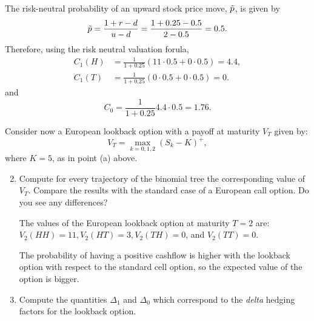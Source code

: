 \documentclass[handout,8pt]{beamer}
\begin{document}
\begin{frame}[allowframebreaks]{ }
\begin{enumerate}
\begin{enumerate}
        The risk-neutral probability of an upward stock price move, $\Tilde{p}$, is given by
        \begin{equation*}
            \Tilde{p}=\frac{1+r-d}{u-d} = \frac{1+0.25-0.5}{2-0.5}=0.5.
        \end{equation*}
        Therefore, using the risk neutral valuation forula,
        \begin{align*}
            C_1(H) &=\frac{1}{1+0.25}(11\cdot 0.5 + 0\cdot 0.5) = 4.4,\\
            C_1(T) &=\frac{1}{1+0.25}(0\cdot 0.5 + 0\cdot 0.5) = 0.
        \end{align*}
        and
        \begin{equation*}
            C_0 = \frac{1}{1+0.25}4.4\cdot 0.5 = 1.76.
        \end{equation*}
    \end{enumerate}

    Consider now a European lookback option with a payoff at maturity $V_T$ given by:
    \begin{equation*}
        V_T=\max_{k=0,1,2}(S_k-K)^+,
    \end{equation*}
    where $K=5$, as in point (a) above.
    
    \begin{enumerate}
        \setcounter{enumii}{1}
    
        \item Compute for every trajectory of the binomial tree the corresponding value of $V_T$. Compare the results with the standard case of a European call option. Do you see any differences?\newline 
        
        The values of the European lookback option at maturity $T=2$ are: $V_2(HH)=11, V_2(HT)=3, V_2(TH)=0$, and $V_2(TT)=0$. \newline 
        
         The probability of having a positive cashflow is higher with the lookback option with respect to the standard cell option, so the expected value of the option is bigger. \newline
    
        \item Compute the quantities $\Delta_1$ and $\Delta_0$ which correspond to the \textit{delta} hedging factors for the lookback option. \newline
        

\end{enumerate}
\end{enumerate}
\end{frame}
\end{document}
